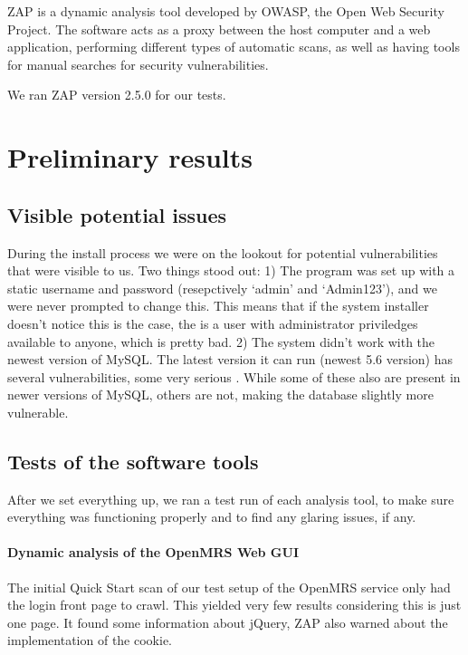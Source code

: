 \documentclass{article}
\begin{document}
ZAP is a dynamic analysis tool developed by OWASP, the Open Web Security
Project. The software acts as a proxy between the host computer and a web
application, performing different types of automatic scans, as well as having
tools for manual searches for security vulnerabilities\autocite[]{ZAP}.


We ran ZAP version 2.5.0 for our tests.

\section{Preliminary results}

\subsection{Visible potential issues}
  During the install process we were on the lookout for potential vulnerabilities that
  were visible to us. Two things stood out:
  1) The program was set up with a static username and password (resepctively `admin'
  and `Admin123'), and we were never prompted to change this. This means that if the system
  installer doesn't notice this is the case, the is a user with administrator priviledges
  available to anyone, which is pretty bad.
  2) The system didn't work with the newest version of MySQL. The latest version it can run (newest 5.6 version)
  has several vulnerabilities, some very serious \autocite[]{CVEDetails}. While some of these
  also are present in newer versions of MySQL, others are not, making the database slightly more vulnerable.

\subsection{Tests of the software tools}

  After we set everything up, we ran a test run of each analysis tool, to make sure
  everything was functioning properly and to find any glaring issues, if any.

\paragraph{Dynamic analysis of the OpenMRS Web GUI}
  
  The initial Quick Start scan of our test setup of the OpenMRS service only had
  the login front page to crawl. This yielded very few results considering this
  is just one page. It found some information about jQuery, ZAP also warned
  about the implementation of the cookie.
  
\end{document}
